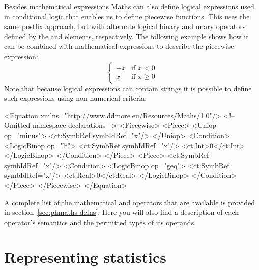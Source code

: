 Besides mathematical expressions \pharmml Maths can also define logical
expressions used in conditional logic that enables us to define
piecewise functions. %
This uses the same postfix approach, but with alternate logical binary
and unary operators defined by the  and
 elements, respectively. The following example shows
how it can be combined with mathematical expressions to describe the
piecewise expression:
%
\[
\begin{cases}
-x & \text{if } x < 0\\
 x & \text{if } x \geq 0
\end{cases}
\]
%
Note that because logical expressions can contain strings it is
possible to define such expressions using non-numerical criteria:
%
\begin{xmlcode}
<Equation xmlns="http://www.ddmore.eu/Resources/Maths/1.0"/>
    <!-- Omitted namespace declarations -->
    <Piecewise>
        <Piece>
            <Uniop op="minus">
                <ct:SymbRef symbIdRef="x"/>
            </Uniop>
            <Condition>
                <LogicBinop op="lt">
                    <ct:SymbRef symbIdRef="x"/>
                    <ct:Int>0</ct:Int>
                </LogicBinop>
            </Condition>
        </Piece>
        <Piece>
            <ct:SymbRef symbIdRef="x"/>
            <Condition>
                <LogicBinop op="geq">
                    <ct:SymbRef symbIdRef="x"/>
                    <ct:Real>0</ct:Real>
                </LogicBinop>
            </Condition>
        </Piece>
    </Piecewise>
</Equation>
\end{xmlcode}

A complete list of the mathematical and operators that are available
is provided in section~\ref{sec:phmaths-defns}.  Here you will also
find a description of each operator's semantics and the permitted types
of its operands.

\section{Representing statistics}


